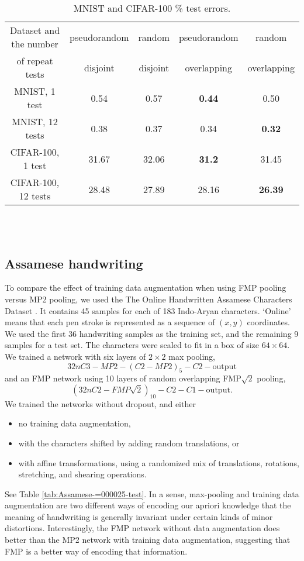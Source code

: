 \documentclass[english]{article}
\begin{document}
\begin{table}
\centering{}
\begin{tabular}{|c|cccc|}
\hline
Dataset and the number & pseudorandom & random & pseudorandom  & random\\
of repeat tests & disjoint & disjoint & overlapping & overlapping\\
\hline
MNIST, 1 test & 0.54 & 0.57 & \textbf{0.44} & 0.50\\
MNIST, 12 tests & 0.38 & 0.37 & 0.34 & \textbf{0.32}\\
CIFAR-100, 1 test & 31.67 & 32.06 & \textbf{31.2} & 31.45\\
CIFAR-100, 12 tests & 28.48 & 27.89 & 28.16 & \textbf{26.39}\\
\hline
\end{tabular}
\ \\
\ \\
\caption{MNIST and CIFAR-100 \% test errors.\label{tab:MNIST-and-CIFAR-10} }
\end{table}



\subsection{Assamese handwriting }

To compare the effect of training data augmentation when using FMP
pooling versus MP2 pooling, we used the The Online Handwritten Assamese
Characters Dataset \cite{UCIrep}. It contains 45 samples for each
of 183 Indo-Aryan characters. `Online' means that each pen stroke is represented as a sequence of $(x,y)$ coordinates.
We used the first 36 handwriting samples
as the training set, and the remaining 9 samples for a test set. The
characters were scaled to fit in a box of size $64\times64$. We trained
a network with six layers of $2\times2$ max pooling,
\[
32nC3-MP2-(C2-MP2)_{5}-C2-\mathrm{output}
\]
and an FMP network using 10 layers of random overlapping FMP$\sqrt{2}$
pooling,
\[
(32nC2-FMP\sqrt{2})_{10}-C2-C1-\mathrm{output}.
\]
We trained the networks without dropout, and either
\begin{itemize}
\item no training data augmentation,
\item with the characters shifted by adding random translations, or
\item with affine transformations, using a randomized mix of translations,
rotations, stretching, and shearing operations.
\end{itemize}
See Table \ref{tab:Assamese-=000025-test}. In a sense, max-pooling
and training data augmentation are two different ways of encoding
our apriori knowledge that the meaning of handwriting is generally
invariant under certain kinds of minor distortions. Interestingly,
the FMP network without data augmentation does better than the MP2
network with training data augmentation, suggesting that FMP is a
better way of encoding that information.
\end{document}
